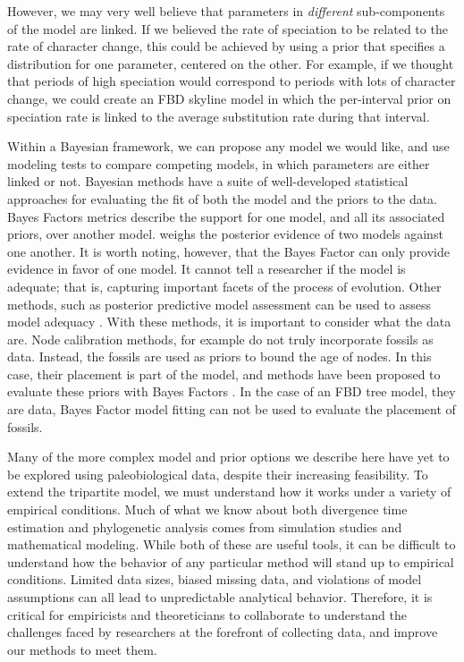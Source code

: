 However, we may very well believe that parameters in \textit{different} sub-components of the model are linked. 
If we believed the rate of speciation to be related to the rate of character change,  
this could be achieved by using a prior that specifies a distribution for one parameter, centered on the other. 
For example, if we thought that periods of high speciation would correspond to periods with lots of character change, we could create an FBD skyline model in which the per-interval prior on speciation rate is linked to the average substitution rate during that interval.

Within a Bayesian framework, we can propose any model we would like, and use modeling tests to compare competing models, in which parameters are either linked or not.
Bayesian methods have a suite of well-developed statistical approaches for evaluating the fit of both the model and the priors to the data.
 Bayes Factors \citep{Xie2011}  metrics  describe the support for one model, and all its associated priors, over another model. 
 weighs the posterior evidence of two models against one another. 
It is worth noting, however, that the Bayes Factor can only provide evidence in favor of one model.
It cannot tell a researcher if the model is adequate; that is, capturing important facets of the process of evolution.
Other methods, such as posterior predictive model assessment can be used to assess model adequacy \citep{Brown2009, Brown2014}.
With these methods, it is important to consider what the data are.
Node calibration methods, for example do not truly incorporate fossils as data.
Instead, the fossils are used as priors to bound the age of nodes.
In this case, their placement is part of the model, and methods have been proposed to evaluate these priors with Bayes Factors \citep{Andujar2014}. %
In the case of an FBD tree model, they are data,  Bayes Factor model fitting can not be used to evaluate the placement of fossils.

Many of the more complex model and prior options we describe here have yet to be explored using paleobiological data, despite their increasing feasibility.
To extend the tripartite model, we must understand how it works under a variety of empirical conditions.
Much of what we know about both divergence time estimation and phylogenetic analysis comes from simulation studies and mathematical modeling.
While both of these are useful tools, it can be difficult to understand how the behavior of any particular method will stand up to empirical conditions.
Limited data sizes, biased missing data, and violations of model assumptions can all lead to unpredictable analytical behavior.
Therefore, it is critical for %
empiricists and theoreticians to collaborate to understand the challenges faced by researchers at the forefront of collecting data, and improve our methods to meet them.


